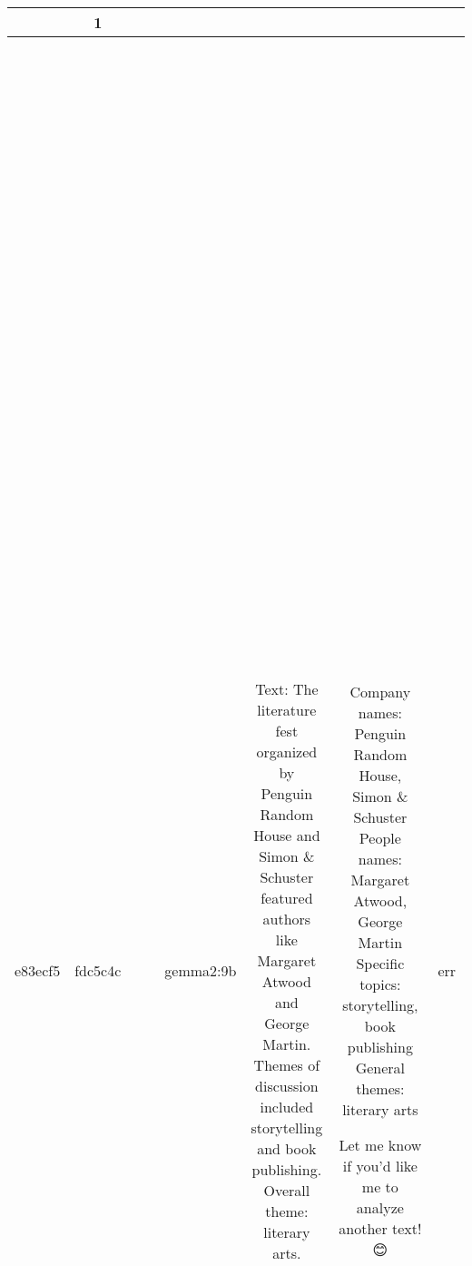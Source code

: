 \begin{table}[h!]
\begin{tabular}{|c|c|c|c|c|c|c|c|c|c|}
{OK & 1\\
\hline
e83ecf5 & fdc5c4c &  &  & gemma2:9b & Text: The literature fest organized by Penguin Random House and Simon \& Schuster featured authors like Margaret Atwood and George Martin. Themes of discussion included storytelling and book publishing. Overall theme: literary arts. & Company names: Penguin Random House, Simon \& Schuster  
People names: Margaret Atwood, George Martin   
Specific topics: storytelling, book publishing 
General themes: literary arts 


Let me know if you'd like me to analyze another text! 😊 
 & err & The chatbot's output includes four distinct sections, formatted as required by the description:

1. **Company names**: Correctly lists company names in a comma-separated format.
2. **People names**: Correctly lists people names in a comma-separated format.
3. **Specific topics**: Correctly lists specific topics in a comma-separated format.
4. **General themes**: Correctly lists general overarching themes in a comma-separated format. 

Additionally, there is a statement "Let me know if you'd like me to analyze another text! 😊" which is not part of the desired format. As per the description, the output should strictly adhere to the desired format specified, and this extraneous statement violates that.

Based on these observations, the output does not fully comply with the chatbot description due to the presence of content outside the desired format specifications.

ERR & 1\\
\hline
e83ecf5 & fdc5c4c &  &  & qwen2.5:3b & Text: The literature fest organized by Penguin Random House and Simon \& Schuster featured authors like Margaret Atwood and George Martin. Themes of discussion included storytelling and book publishing. Overall theme: literary arts. & ```json
{
  "Company names": "Penguin Random House, Simon \& Schuster",
  "-||-",
  "Specific topics": "storytelling, book publishing, literary arts",
  "-||-",
  "General themes": "literary arts"
}
```

### Explanation:
- **Company names**: The text mentions "Penguin Random House" and "Simon \& Schuster".
- **Specific topics**: The major specific topics mentioned are "storytelling", "book publishing", and the general "literary arts".
- **General themes** (which is essentially what you would extract as a broader overarching theme in this context): "literary arts". & err & The output does not match the desired format specified in the chatbot description. The description clearly indicates that the extracted entities should be listed in a specific structured format:

}
\end{tabular}
\end{table}
